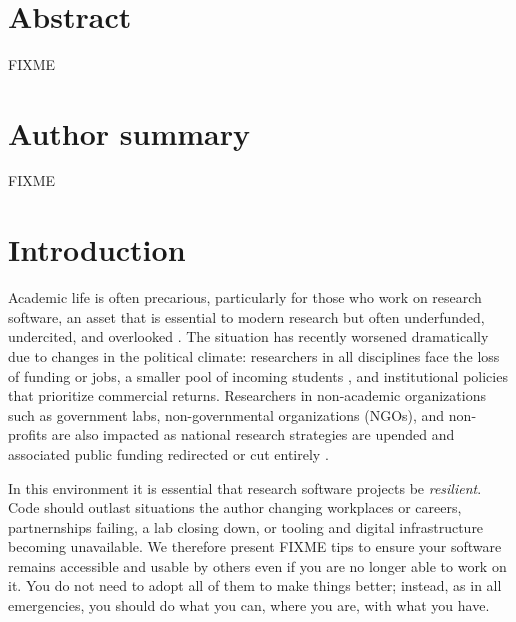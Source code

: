 \documentclass[10pt,letterpaper]{article}
\begin{document}
\vspace*{0.2in}

\begin{flushleft}
{\Large
\textbf{}
}
\newline
\\

\end{flushleft}

\section*{Abstract}

FIXME

\section*{Author summary}

FIXME

\linenumbers

\section*{Introduction}

Academic life is often precarious,
particularly for those who work on research software,
an asset that is essential to modern research \cite{Pearson2025}
but often underfunded, undercited, and overlooked \cite{Carver2022}.
The situation has recently worsened dramatically due to changes in the political climate:
researchers in all disciplines face the loss of funding or jobs,
a smaller pool of incoming students \cite{Mallapaty2025},
and institutional policies that prioritize commercial returns.
Researchers in non-academic organizations
such as government labs, non-governmental organizations (NGOs), and non-profits are also impacted \cite{Woodward2025}
as national research strategies are upended
and associated public funding redirected or cut entirely \cite{Nature2025}.

In this environment it is essential that research software projects be \emph{resilient}.
Code should outlast situations the author changing workplaces or careers,
partnernships failing,
a lab closing down,
or tooling and digital infrastructure becoming unavailable.
We therefore present FIXME tips to ensure your software remains accessible and usable by others
even if you are no longer able to work on it.
You do not need to adopt all of them to make things better;
instead,
as in all emergencies,
you should do what you can,
where you are,
with what you have.
\end{document}
